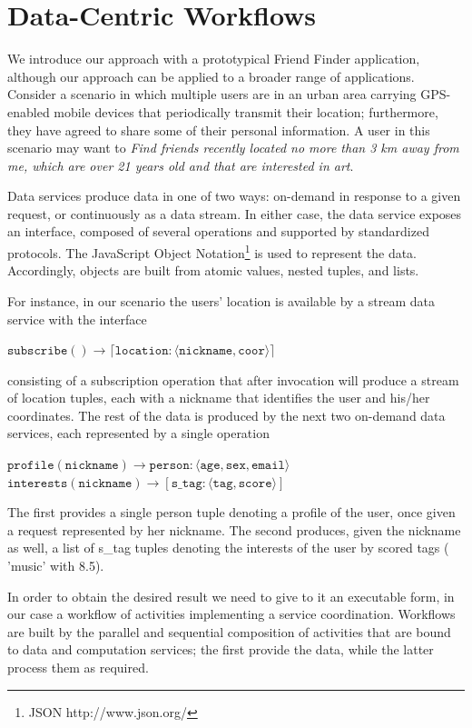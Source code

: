 
\section{Data-Centric Workflows}\label{sec:serviceOrientedWorkflows}

We introduce our approach with a prototypical Friend Finder application, although our approach can be applied to a broader range of applications. Consider a scenario in which multiple users are in an urban area carrying GPS-enabled mobile devices that periodically transmit their location; furthermore, they have agreed to share some of their personal information. A user in this scenario may want to \textit{Find friends recently located no more than 3 km away from me, which are over 21 years old and that are interested in art}.

Data services produce data in one of two ways: on-demand in response to a given request, or continuously as a data stream. In either case, the data service exposes an interface, composed of several operations and supported by standardized protocols. The JavaScript Object Notation\footnote{JSON http://www.json.org/} is used to represent the data. Accordingly, objects are built from atomic values, nested tuples, and lists.
	
For instance, in our scenario the users' location is available by a stream data service with the interface
	
$\mathtt{subscribe() \rightarrow \lceil location:\langle nickname, coor\rangle\rceil}$
	
consisting of a subscription operation that after invocation will produce a stream of location tuples, each with a nickname that identifies the user and his/her coordinates. The rest of the data is produced by the next two on-demand data services, each represented by a single operation
	
$\mathtt{profile(nickname) \rightarrow person:\langle age, sex, email\rangle}$
\\
$\mathtt{interests(nickname) \rightarrow \left[s\_tag:\langle tag, score\rangle\right]}$
	
	
The first provides a single person tuple denoting a profile of the user, once given a request represented by her nickname. The second produces, given the nickname as well, a list of s\_tag tuples denoting the interests of the user by scored tags (\eg{} 'music' with 8.5).
	
In order to obtain the desired result we need to give to it an executable form, in our case a workflow of activities implementing a service coordination. Workflows are built by the parallel and sequential composition of activities that are bound to data and computation services; the first provide the data, while the latter process them as required.

